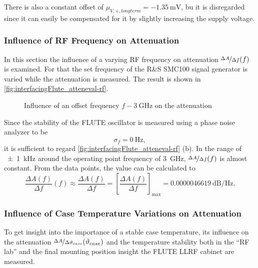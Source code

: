 There is also a constant offset of $\mu_{V,+,longterm}=\SI{-1.35}{\milli\volt}$, bu it is disregarded since it can easily be compensated for it by slightly increasing the supply voltage.

\subsubsection{Influence of RF Frequency on Attenuation}
In this section the influence of a varying RF frequency on attenuation $\nicefrac{\Delta A}{\Delta f} (f)$ is examined. For that the set frequency of the R\&S SMC100 signal generator is varied while the attenuation is measured. The result is shown in \autoref{fig:interfacingFlute_atteneval-rf}.

\begin{figure}[tb]
    \centering
        \subfloat[$f=f_o \SI{+-30}{\kHz}$]{}
        \qquad
        \subfloat[$f=f_o \SI{+-1}{\kHz}$]{}
       \caption{Influence of an offset frequency $f-\SI{3}{\GHz}$ on the attenuation }
    \label{fig:interfacingFlute_atteneval-rf}
\end{figure}

Since the stability of the FLUTE oscillator is measured using a phase noise analyzer to be
\begin{equation}
\sigma_f = \SI{0}{\hertz},
\end{equation}
it is sufficient to regard \autoref{fig:interfacingFlute_atteneval-rf} (b). In the range of \SI{\pm1}{\kHz} around the operating point frequency of \SI{3}{\GHz}, $\nicefrac{\Delta A}{\Delta f} (f)$ is almost constant. From the data points, the value can be calculated to
\begin{equation}
\frac{\Delta A(f)}{\Delta f}(f) 
\approx \frac{\Delta A(f)}{\Delta f} 
= \left[\frac{\Delta A(f)}{\Delta f}\right]_\text{max}
=\SI{0.0000046619}{\dB\per\hertz}.
\end{equation}

\subsubsection{Influence of Case Temperature Variations on Attenuation}
To get insight into the importance of a stable case temperature, its influence on the attenuation $\nicefrac{\Delta A}{\Delta \vartheta_{case}} (\vartheta_{case})$ and the temperature stability both in the ``RF lab'' and the final mounting position insight the FLUTE LLRF cabinet are measured.

